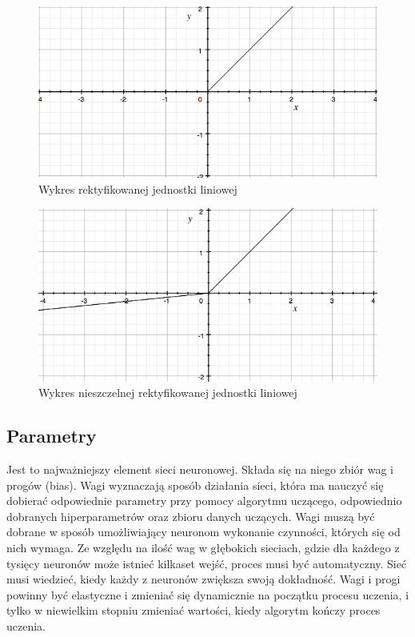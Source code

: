 \documentclass[12pt,a4paper,twoside,titlepage,openright]{book}
\begin{document}
\begin{figure}[ht]
	\centering
			\includegraphics[resolution=100, scale=0.8]{ReLU.png}
		\caption{Wykres rektyfikowanej jednostki liniowej}
\end{figure}

\begin{figure}[ht]
	\centering
			\includegraphics[resolution=100, scale=0.8]{leakyReLU.png}
		\caption{Wykres nieszczelnej rektyfikowanej jednostki liniowej}
\end{figure}

\subsection{Parametry}
Jest to najważniejszy element sieci neuronowej. Składa się na niego zbiór wag i progów (bias). Wagi wyznaczają sposób działania sieci, która ma nauczyć się dobierać odpowiednie parametry przy pomocy algorytmu uczącego, odpowiednio dobranych hiperparametrów oraz zbioru danych uczących. Wagi muszą być dobrane w sposób umożliwiający neuronom wykonanie czynności, których się od nich wymaga. Ze względu na ilość wag w głębokich sieciach, gdzie dla każdego z tysięcy neuronów może istnieć kilkaset wejść, proces musi być automatyczny. Sieć musi wiedzieć, kiedy każdy z neuronów zwiększa swoją dokładność. Wagi i progi powinny być elastyczne i zmieniać się dynamicznie na początku procesu uczenia, i tylko w niewielkim stopniu zmieniać wartości, kiedy algorytm kończy proces uczenia.
\end{document}
